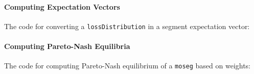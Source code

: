 \documentclass[a4paper]{scrreprt}
\theoremstyle{definition}
\begin{document}
    \paragraph{Computing Expectation Vectors}
    The code for converting a \texttt{lossDistribution} in a segment expectation vector:
    
    
    \paragraph{Computing Pareto-Nash Equilibria}
    The code for computing Pareto-Nash equilibrium of a \texttt{moseg} based on weights:
    
    
    
    
    \printbibliography
\end{document}
